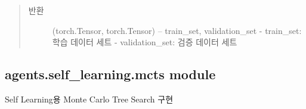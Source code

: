 \documentclass[letterpaper,10pt,english]{sphinxmanual}
\begin{document}
\begin{fulllineitems}
\begin{fulllineitems}
\begin{quote}
\begin{description}
\item[{반환}] \leavevmode
(torch.Tensor, torch.Tensor) -- train\_set, validation\_set
- train\_set: 학습 데이터 세트
- validation\_set: 검증 데이터 세트

\end{description}\end{quote}

\end{fulllineitems}


\begin{fulllineitems}
\label{\detokenize{agents.self_learning:agents.self_learning.memory.ReplayMemory.pos}}
\end{fulllineitems}


\begin{fulllineitems}
\label{\detokenize{agents.self_learning:agents.self_learning.memory.ReplayMemory.size}}
\end{fulllineitems}


\end{fulllineitems}



\subsection{agents.self\_learning.mcts module}
\label{\detokenize{agents.self_learning:agents-self-learning-mcts-module}}\label{\detokenize{agents.self_learning:module-agents.self_learning.mcts}}
Self Learning용 Monte Carlo Tree Search 구현
\end{document}
